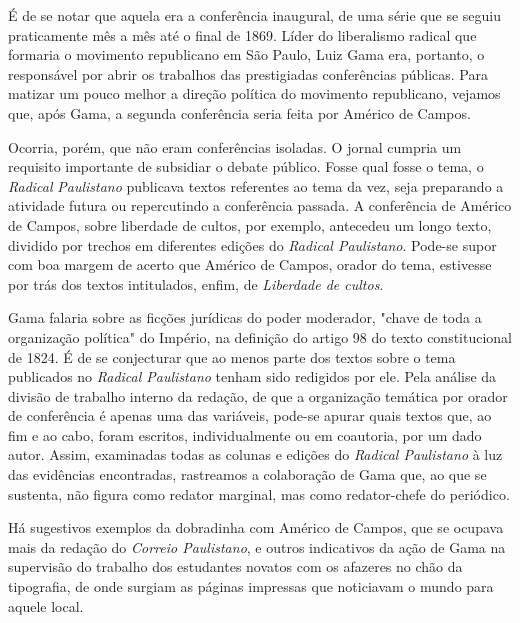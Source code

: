 É de se notar que aquela era a conferência inaugural, de uma série que
se seguiu praticamente mês a mês até o final de 1869. Líder do
liberalismo radical que formaria o movimento republicano em São Paulo,
Luiz Gama era, portanto, o responsável por abrir os trabalhos das
prestigiadas conferências públicas. Para matizar um pouco melhor a
direção política do movimento republicano, vejamos que, após Gama, a
segunda conferência seria feita por Américo de Campos.

Ocorria, porém, que não eram conferências isoladas. O jornal cumpria um
requisito importante de subsidiar o debate público. Fosse qual fosse o
tema, o \emph{Radical} \emph{Paulistano} publicava textos referentes ao
tema da vez, seja preparando a atividade futura ou repercutindo a
conferência passada. A conferência de Américo de Campos, sobre liberdade
de cultos, por exemplo, antecedeu um longo texto, dividido por trechos
em diferentes edições do \emph{Radical Paulistano}. Pode-se supor com
boa margem de acerto que Américo de Campos, orador do tema, estivesse
por trás dos textos intitulados, enfim, de \emph{Liberdade de cultos}.

Gama falaria sobre as ficções jurídicas do poder moderador, "chave de
toda a organização política" do Império, na definição do artigo 98 do
texto constitucional de 1824. É de se conjecturar que ao menos parte dos
textos sobre o tema publicados no \emph{Radical Paulistano} tenham sido
redigidos por ele. Pela análise da divisão de trabalho interno da
redação, de que a organização temática por orador de conferência é
apenas uma das variáveis, pode-se apurar quais textos que, ao fim e ao
cabo, foram escritos, individualmente ou em coautoria, por um dado
autor. Assim, examinadas todas as colunas e edições do \emph{Radical
Paulistano} à luz das evidências encontradas, rastreamos a colaboração
de Gama que, ao que se sustenta, não figura como redator marginal, mas
como redator-chefe do periódico.

Há sugestivos exemplos da dobradinha com Américo de Campos, que se
ocupava mais da redação do \emph{Correio Paulistano}, e outros
indicativos da ação de Gama na supervisão do trabalho dos estudantes
novatos com os afazeres no chão da tipografia, de onde surgiam as
páginas impressas que noticiavam o mundo para aquele local.

